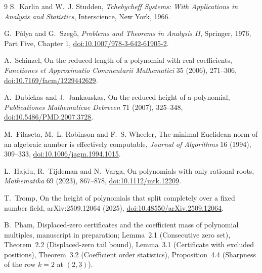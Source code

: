 \documentclass[11pt]{article}
\theoremstyle{definition}
\theoremstyle{plain}
\begin{document}
\begin{thebibliography}{9}
\small
{}
S.~Karlin and W.~J. Studden,
\newblock \emph{Tchebycheff Systems: With Applications in Analysis and Statistics},
\newblock Interscience, New York, 1966.

G.~P\'olya and G.~Szeg\H{o},
\newblock \emph{Problems and Theorems in Analysis II},
\newblock Springer, 1976, Part Five, Chapter 1,
\newblock \href{https://doi.org/10.1007/978-3-642-61905-2}
{doi:10.1007/978-3-642-61905-2}.

A.~Schinzel,
\newblock On the reduced length of a polynomial with real coefficients,
\newblock \emph{Functiones et Approximatio Commentarii Mathematici} 35 (2006), 271--306,
\newblock \href{https://doi.org/10.7169/facm/1229442629}
{doi:10.7169/facm/1229442629}.

A.~Dubickas and J.~Jankauskas,
\newblock On the reduced height of a polynomial,
\newblock \emph{Publicationes Mathematicae Debrecen} 71 (2007), 325--348,
\newblock \href{https://doi.org/10.5486/PMD.2007.3728}
{doi:10.5486/PMD.2007.3728}.

M.~Filaseta, M.~L. Robinson and F.~S. Wheeler,
\newblock The minimal Euclidean norm of an algebraic number is effectively
computable,
\newblock \emph{Journal of Algorithms} 16 (1994), 309--333,
\newblock \href{https://doi.org/10.1006/jagm.1994.1015}
{doi:10.1006/jagm.1994.1015}.

L.~Hajdu, R.~Tijdeman and N.~Varga,
\newblock On polynomials with only rational roots,
\newblock \emph{Mathematika} 69 (2023), 867--878,
\newblock \href{https://doi.org/10.1112/mtk.12209}
{doi:10.1112/mtk.12209}.

T.~Tromp,
\newblock On the height of polynomials that split completely over a fixed
number field,
\newblock arXiv:2509.12064 (2025),
\newblock \href{https://doi.org/10.48550/arXiv.2509.12064}
{doi:10.48550/arXiv.2509.12064}.

B.~Pham,
\newblock Displaced-zero certificates and the coefficient mass of polynomial
multiples,
\newblock manuscript in preparation;
Lemma~2.1 (Consecutive zero set), Theorem~2.2 (Displaced-zero tail bound),
Lemma~3.1 (Certificate with excluded positions), Theorem~3.2 (Coefficient order statistics),
Proposition~4.4 (Sharpness of the row $k=2$ at $(2,3)$).
\end{thebibliography}
\end{document}

